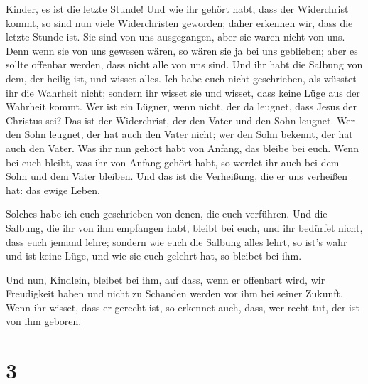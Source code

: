  Kinder, es ist die letzte Stunde! Und wie ihr gehört
habt, dass der Widerchrist kommt, so sind nun viele Widerchristen
geworden; daher erkennen wir, dass die letzte Stunde ist.
 Sie sind von uns ausgegangen, aber sie waren nicht von
uns. Denn wenn sie von uns gewesen wären, so wären sie ja bei uns
geblieben; aber es sollte offenbar werden, dass nicht alle von uns sind.
 Und ihr habt die Salbung von dem, der heilig ist, und
wisset alles.  Ich habe euch nicht geschrieben, als
wüsstet ihr die Wahrheit nicht; sondern ihr wisset sie und wisset, dass
keine Lüge aus der Wahrheit kommt.  Wer ist ein Lügner,
wenn nicht, der da leugnet, dass Jesus der Christus sei? Das ist der
Widerchrist, der den Vater und den Sohn leugnet.  Wer den
Sohn leugnet, der hat auch den Vater nicht; wer den Sohn bekennt, der
hat auch den Vater.  Was ihr nun gehört habt von Anfang,
das bleibe bei euch. Wenn bei euch bleibt, was ihr von Anfang gehört
habt, so werdet ihr auch bei dem Sohn und dem Vater bleiben.
 Und das ist die Verheißung, die er uns verheißen hat:
das ewige Leben.

 Solches habe ich euch geschrieben von denen, die euch
verführen.  Und die Salbung, die ihr von ihm empfangen
habt, bleibt bei euch, und ihr bedürfet nicht, dass euch jemand lehre;
sondern wie euch die Salbung alles lehrt, so ist's wahr und ist keine
Lüge, und wie sie euch gelehrt hat, so bleibet bei ihm.

 Und nun, Kindlein, bleibet bei ihm, auf dass, wenn er
offenbart wird, wir Freudigkeit haben und nicht zu Schanden werden vor
ihm bei seiner Zukunft.  Wenn ihr wisset, dass er gerecht
ist, so erkennet auch, dass, wer recht tut, der ist von ihm geboren.

\hypertarget{section-2}{%
\section{3}\label{section-2}}


